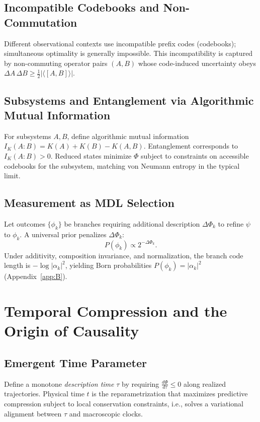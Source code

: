 \documentclass[aps,preprint,onecolumn,longbibliography,nofootinbib]{revtex4-2}
\numberwithin{equation}{section}
\begin{document}
\subsection{Incompatible Codebooks and Non-Commutation}
Different observational contexts use incompatible prefix codes (codebooks); simultaneous optimality is generally impossible. This incompatibility is captured by non-commuting operator pairs $(A,B)$ whose code-induced uncertainty obeys $\Delta A\,\Delta B\ge \tfrac12|\langle[A,B]\rangle|$.

\subsection{Subsystems and Entanglement via Algorithmic Mutual Information}
For subsystems $A,B$, define algorithmic mutual information $I_K(A\!:\!B)=K(A)+K(B)-K(A,B)$. Entanglement corresponds to $I_K(A\!:\!B)>0$. Reduced states minimize $\Phi$ subject to constraints on accessible codebooks for the subsystem, matching von Neumann entropy in the typical limit.

\subsection{Measurement as MDL Selection}
Let outcomes $\{\phi_k\}$ be branches requiring additional description $\Delta\Phi_k$ to refine $\psi$ to $\phi_k$. A universal prior penalizes $\Delta\Phi_k$:
\begin{equation}
P(\phi_k)\propto 2^{-\Delta\Phi_k}. \label{eq:compprior}
\end{equation}
Under additivity, composition invariance, and normalization, the branch code length is $-\log|\alpha_k|^2$, yielding Born probabilities $P(\phi_k)=|\alpha_k|^2$ (Appendix~\ref{app:B}).

\section{Temporal Compression and the Origin of Causality}
\subsection{Emergent Time Parameter}
Define a monotone \emph{description time} $\tau$ by requiring $\tfrac{d\Phi}{d\tau}\le 0$ along realized trajectories. Physical time $t$ is the reparametrization that maximizes predictive compression subject to local conservation constraints, i.e., solves a variational alignment between $\tau$ and macroscopic clocks.
\end{document}
